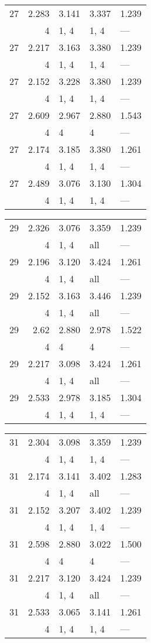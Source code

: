 \begin{tabular}{lrlll}
\toprule
 27 & 2.283 & 3.141 & 3.337 & 1.239 \\
    & 4     & 1, 4  & 1, 4  & ---   \\
 27 & 2.217 & 3.163 & 3.380 & 1.239 \\
    & 4     & 1, 4  & 1, 4  & ---   \\
 27 & 2.152 & 3.228 & 3.380 & 1.239 \\
    & 4     & 1, 4  & 1, 4  & ---   \\
 27 & 2.609 & 2.967 & 2.880 & 1.543 \\
    & 4     & 4     & 4     & ---   \\
 27 & 2.174 & 3.185 & 3.380 & 1.261 \\
    & 4     & 1, 4  & 1, 4  & ---   \\
 27 & 2.489 & 3.076 & 3.130 & 1.304 \\
    & 4     & 1, 4  & 1, 4  & ---   \\
\bottomrule
\end{tabular}
\begin{tabular}{lrlll}
\toprule
 29 & 2.326 & 3.076 & 3.359 & 1.239 \\
    & 4     & 1, 4  & all   & ---   \\
 29 & 2.196 & 3.120 & 3.424 & 1.261 \\
    & 4     & 1, 4  & all   & ---   \\
 29 & 2.152 & 3.163 & 3.446 & 1.239 \\
    & 4     & 1, 4  & all   & ---   \\
 29 & 2.62  & 2.880 & 2.978 & 1.522 \\
    & 4     & 4     & 4     & ---   \\
 29 & 2.217 & 3.098 & 3.424 & 1.261 \\
    & 4     & 1, 4  & all   & ---   \\
 29 & 2.533 & 2.978 & 3.185 & 1.304 \\
    & 4     & 1, 4  & 1, 4  & ---   \\
\bottomrule
\end{tabular}
\begin{tabular}{lrlll}
\toprule
 31 & 2.304 & 3.098 & 3.359 & 1.239 \\
    & 4     & 1, 4  & 1, 4  & ---   \\
 31 & 2.174 & 3.141 & 3.402 & 1.283 \\
    & 4     & 1, 4  & all   & ---   \\
 31 & 2.152 & 3.207 & 3.402 & 1.239 \\
    & 4     & 1, 4  & 1, 4  & ---   \\
 31 & 2.598 & 2.880 & 3.022 & 1.500 \\
    & 4     & 4     & 4     & ---   \\
 31 & 2.217 & 3.120 & 3.424 & 1.239 \\
    & 4     & 1, 4  & all   & ---   \\
 31 & 2.533 & 3.065 & 3.141 & 1.261 \\
    & 4     & 1, 4  & 1, 4  & ---   \\
\bottomrule
\end{tabular}
